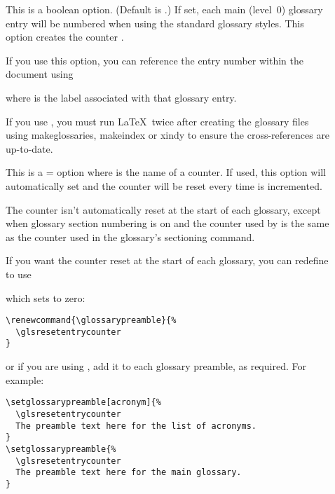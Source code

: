 \documentclass[report,inlinetitle]{nlctdoc}
\renewcommand*{\glossarypreamble}{%
\emph{This glossary style was setup using:}
\begin{ttfamily}
\begin{tabbing}
\cs{usepackage}[\=xindy,\\
\+\>nonumberlist,\\
  toc,\\
  nopostdot,\\
  style=altlist,\\
  nogroupskip]\{glossaries\}
\end{tabbing}
\cs{glsnoexpandfields}\newline
\cs{renewcommand*}\{\ics{glsseeformat}\}[3][\ics{seename}]\{\% \newline
(\ics{xmakefirstuc}\{\#1\} \ics{glsseelist}\{\#2\}.)\}
\end{ttfamily}
}
\begin{document}
\begin{description}
\item[] This is a boolean option. (Default
is .) If set, each main (level~0)
glossary entry will be numbered when using the standard glossary
styles. This option creates the counter
.

If you use this option, you can reference the entry number
within the document using
\begin{definition}[\DescribeMacro{\glsrefentry}]
\end{definition}
where  is the label associated with that glossary entry.

\begin{important}
If you use , you must run \LaTeX\ twice after
creating the glossary files using \gls{makeglossaries},
\gls{makeindex} or \gls{xindy} to ensure the cross-references are
up-to-date.
\end{important}

\item[] This is a =
option where  is the name of a counter. If used, this
option will automatically set  and the
 counter will be reset every time  is
incremented.


\begin{important}
The  counter isn't automatically reset at the
start of each glossary, except when glossary section numbering is on
and the counter used by  is the same as the
counter used in the glossary's sectioning command.
\end{important}

If you want the counter reset at the start of each glossary, you can
redefine  to use
\begin{definition}[\DescribeMacro{\glsresetentrycounter}]
\end{definition}
which sets  to zero:
\begin{verbatim}
\renewcommand{\glossarypreamble}{%
  \glsresetentrycounter
}
\end{verbatim}
or if you are using , add it to each
glossary preamble, as required. For example:
\begin{verbatim}
\setglossarypreamble[acronym]{%
  \glsresetentrycounter
  The preamble text here for the list of acronyms.
}
\setglossarypreamble{%
  \glsresetentrycounter
  The preamble text here for the main glossary.
}
\end{verbatim}


\end{description}
\end{document}
